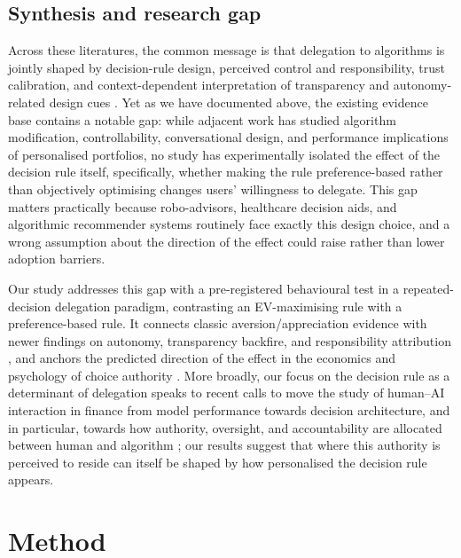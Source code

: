 \documentclass[a4paper, 12pt, fleqn]{article}
\theoremstyle{hypstyle}
\begin{document}
\subsection{Synthesis and research gap}
Across these literatures, the common message is that delegation to algorithms is jointly shaped by decision-rule design, perceived control and responsibility, trust calibration, and context-dependent interpretation of transparency and autonomy-related design cues \citep{Dietvorst2018,Chugunova2022,Schaap2024,Fink2024,Hu2024}. Yet as we have documented above, the existing evidence base contains a notable gap: while adjacent work has studied algorithm modification, controllability, conversational design, and performance implications of personalised portfolios, no study has experimentally isolated the effect of the decision rule itself, specifically, whether making the rule preference-based rather than objectively optimising changes users' willingness to delegate. This gap matters practically because robo-advisors, healthcare decision aids, and algorithmic recommender systems routinely face exactly this design choice, and a wrong assumption about the direction of the effect could raise rather than lower adoption barriers.

Our study addresses this gap with a pre-registered behavioural test in a repeated-decision delegation paradigm, contrasting an EV-maximising rule with a preference-based rule. It connects classic aversion/appreciation evidence with newer findings on autonomy, transparency backfire, and responsibility attribution \citep{Logg2019,Fink2024,Hu2024,Gazit2023}, and anchors the predicted direction of the effect in the economics and psychology of choice authority \citep{Brehm1966,DeciRyan2000,FreyBenzStutzer2004,Leotti2010,Bartling2014,Owens2014}. More broadly, our focus on the decision rule as a determinant of delegation speaks to recent calls to move the study of human--AI interaction in finance from model performance towards decision architecture, and in particular, towards how authority, oversight, and accountability are allocated between human and algorithm \citep{Kou2026}; our results suggest that where this authority is perceived to reside can itself be shaped by how personalised the decision rule appears.

\section{Method}
\label{sec:method}
\end{document}
